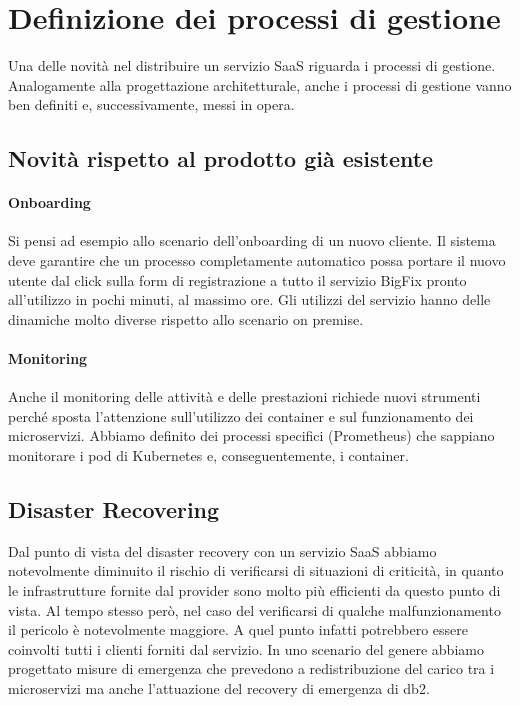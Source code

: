 \section{Definizione dei processi di gestione}
Una delle novità nel distribuire un servizio SaaS riguarda i processi di gestione. Analogamente alla progettazione architetturale, anche i processi di gestione vanno ben definiti e, successivamente, messi in opera.

\subsection{Novità rispetto al prodotto già esistente}

\paragraph{Onboarding}
Si pensi ad esempio allo scenario dell'onboarding di  un nuovo cliente. Il sistema deve garantire che un processo completamente automatico possa portare il nuovo utente dal click sulla form di registrazione a tutto il servizio BigFix pronto all'utilizzo in pochi minuti, al massimo ore. Gli utilizzi del servizio hanno delle dinamiche molto diverse rispetto allo scenario on premise.

\paragraph{Monitoring}
Anche il monitoring delle attività e delle prestazioni richiede nuovi strumenti perché sposta l'attenzione sull'utilizzo dei container e sul funzionamento dei microservizi. Abbiamo definito dei processi specifici (Prometheus) che sappiano monitorare i pod di Kubernetes e, conseguentemente, i container.

\subsection{Disaster Recovering}
Dal punto di vista del disaster recovery con un servizio SaaS abbiamo notevolmente diminuito il rischio di verificarsi di situazioni di criticità, in quanto le infrastrutture fornite dal provider sono molto più efficienti da questo punto di vista. Al tempo stesso però, nel caso del verificarsi di qualche malfunzionamento il pericolo è notevolmente maggiore. A quel punto infatti potrebbero essere coinvolti tutti i clienti forniti dal servizio. In uno scenario del genere abbiamo progettato misure di emergenza che prevedono a redistribuzione del carico tra i microservizi ma anche l'attuazione del recovery di emergenza di db2.
